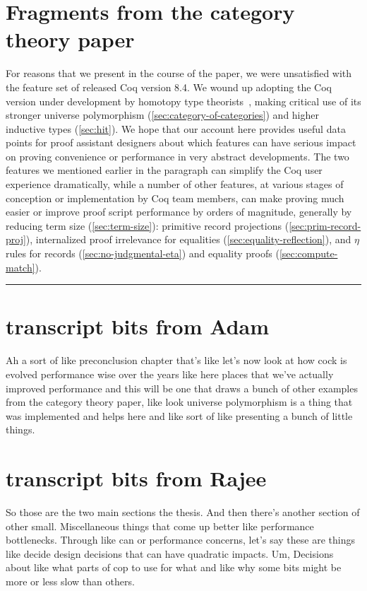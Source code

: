 \begin{subappendices}
    \section{Fragments from the category theory paper}
    For reasons that we present in the course of the paper, we were unsatisfied with the feature set of released Coq version 8.4.  We wound up adopting the Coq version under development by homotopy type theorists~\cite{HoTT/coq}, making critical use of its stronger universe polymorphism (\autoref{sec:category-of-categories}) and higher inductive types (\autoref{sec:hit}).  We hope that our account here provides useful data points for proof assistant designers about which features can have serious impact on proving convenience or performance in very abstract developments.  The two features we mentioned earlier in the paragraph can simplify the Coq user experience dramatically, while a number of other features, at various stages of conception or implementation by Coq team members, can make proving much easier or improve proof script performance by orders of magnitude, generally by reducing term size (\autoref{sec:term-size}): primitive record projections (\autoref{sec:prim-record-proj}), internalized proof irrelevance for equalities (\autoref{sec:equality-reflection}), and $\eta$ rules for records (\autoref{sec:no-judgmental-eta}) and equality proofs (\autoref{sec:compute-match}).

    \hrule


    \section{transcript bits from Adam}
    Ah a sort of like preconclusion chapter that's like let's now look at how cock is evolved performance wise over the years like here places that we've actually improved performance and this will be one that draws a bunch of other examples from the category theory paper, like look universe polymorphism is a thing that was implemented and helps here and like sort of like presenting a bunch of little things.
\section{transcript bits from Rajee}
So those are the two main sections the thesis. And then there's another section of other small. Miscellaneous things that come up better like performance bottlenecks. Through like can or performance concerns, let's say these are things like decide design decisions that can have quadratic impacts. Um, Decisions about like what parts of cop to use for what and like why some bits might be more or less slow than others.


\end{subappendices}
